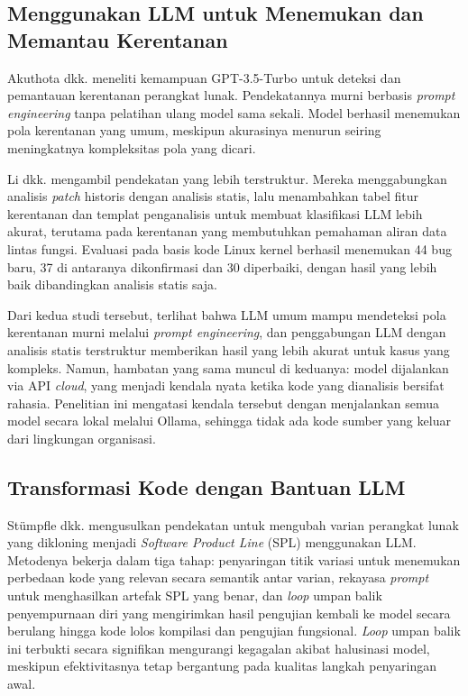     \subsection{Menggunakan LLM untuk Menemukan dan Memantau Kerentanan}

    Akuthota dkk. \cite{akuthota2023vulnerability} meneliti kemampuan GPT-3.5-Turbo untuk deteksi dan pemantauan kerentanan perangkat lunak. Pendekatannya murni berbasis \textit{prompt engineering} tanpa pelatihan ulang model sama sekali. Model berhasil menemukan pola kerentanan yang umum, meskipun akurasinya menurun seiring meningkatnya kompleksitas pola yang dicari.

    Li dkk. \cite{li2025software} mengambil pendekatan yang lebih terstruktur. Mereka menggabungkan analisis \textit{patch} historis dengan analisis statis, lalu menambahkan tabel fitur kerentanan dan templat penganalisis untuk membuat klasifikasi LLM lebih akurat, terutama pada kerentanan yang membutuhkan pemahaman aliran data lintas fungsi. Evaluasi pada basis kode Linux kernel berhasil menemukan 44 bug baru, 37 di antaranya dikonfirmasi dan 30 diperbaiki, dengan hasil yang lebih baik dibandingkan analisis statis saja.

    Dari kedua studi tersebut, terlihat bahwa LLM umum mampu mendeteksi pola kerentanan murni melalui \textit{prompt engineering}, dan penggabungan LLM dengan analisis statis terstruktur memberikan hasil yang lebih akurat untuk kasus yang kompleks. Namun, hambatan yang sama muncul di keduanya: model dijalankan via API \textit{cloud}, yang menjadi kendala nyata ketika kode yang dianalisis bersifat rahasia. Penelitian ini mengatasi kendala tersebut dengan menjalankan semua model secara lokal melalui Ollama, sehingga tidak ada kode sumber yang keluar dari lingkungan organisasi.

    \subsection{Transformasi Kode dengan Bantuan LLM}

    St\"{u}mpfle dkk. \cite{stumpfle2025llm} mengusulkan pendekatan untuk mengubah varian perangkat lunak yang dikloning menjadi \textit{Software Product Line} (SPL) menggunakan LLM. Metodenya bekerja dalam tiga tahap: penyaringan titik variasi untuk menemukan perbedaan kode yang relevan secara semantik antar varian, rekayasa \textit{prompt} untuk menghasilkan artefak SPL yang benar, dan \textit{loop} umpan balik penyempurnaan diri yang mengirimkan hasil pengujian kembali ke model secara berulang hingga kode lolos kompilasi dan pengujian fungsional. \textit{Loop} umpan balik ini terbukti secara signifikan mengurangi kegagalan akibat halusinasi model, meskipun efektivitasnya tetap bergantung pada kualitas langkah penyaringan awal.

